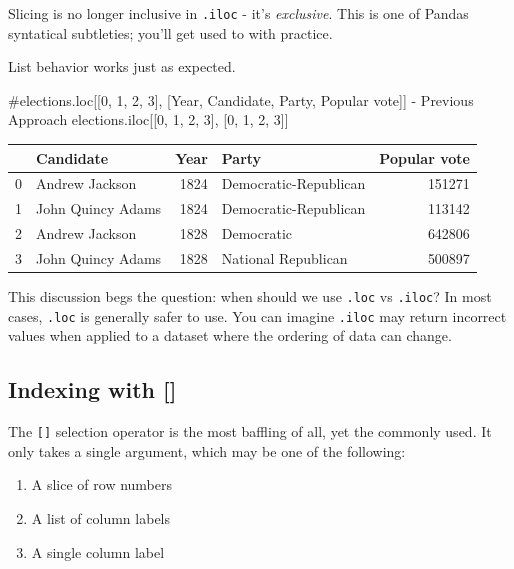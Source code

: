 \documentclass[
  letterpaper,
  DIV=11,
  numbers=noendperiod]{scrreprt}
\newenvironment{Shaded}{\begin{snugshade}}{\end{snugshade}}
\newcommand{\CommentTok}[1]{\textcolor[rgb]{0.37,0.37,0.37}{#1}}
\newcommand{\DecValTok}[1]{\textcolor[rgb]{0.68,0.00,0.00}{#1}}
\newcommand{\NormalTok}[1]{\textcolor[rgb]{0.00,0.23,0.31}{#1}}
\providecommand{\tightlist}{%
  \setlength{\itemsep}{0pt}\setlength{\parskip}{0pt}}\usepackage{longtable,booktabs,array}
\begin{document}
Slicing is no longer inclusive in \texttt{.iloc} - it's
\emph{exclusive}. This is one of Pandas syntatical subtleties; you'll
get used to with practice.

List behavior works just as expected.

\begin{Shaded}
\begin{Highlighting}[]
\CommentTok{\#elections.loc[[0, 1, 2, 3], [\textquotesingle{}Year\textquotesingle{}, \textquotesingle{}Candidate\textquotesingle{}, \textquotesingle{}Party\textquotesingle{}, \textquotesingle{}Popular vote\textquotesingle{}]] {-} Previous Approach}
\NormalTok{elections.iloc[[}\DecValTok{0}\NormalTok{, }\DecValTok{1}\NormalTok{, }\DecValTok{2}\NormalTok{, }\DecValTok{3}\NormalTok{], [}\DecValTok{0}\NormalTok{, }\DecValTok{1}\NormalTok{, }\DecValTok{2}\NormalTok{, }\DecValTok{3}\NormalTok{]]}
\end{Highlighting}
\end{Shaded}

\begin{tabular}{llrlr}
\toprule
{} &          Candidate &  Year &                  Party &  Popular vote \\
\midrule
0 &     Andrew Jackson &  1824 &  Democratic-Republican &        151271 \\
1 &  John Quincy Adams &  1824 &  Democratic-Republican &        113142 \\
2 &     Andrew Jackson &  1828 &             Democratic &        642806 \\
3 &  John Quincy Adams &  1828 &    National Republican &        500897 \\
\bottomrule
\end{tabular}

This discussion begs the question: when should we use \texttt{.loc} vs
\texttt{.iloc}? In most cases, \texttt{.loc} is generally safer to use.
You can imagine \texttt{.iloc} may return incorrect values when applied
to a dataset where the ordering of data can change.

\hypertarget{indexing-with}{%
\subsection{Indexing with {[}{]}}\label{indexing-with}}

The \texttt{{[}{]}} selection operator is the most baffling of all, yet
the commonly used. It only takes a single argument, which may be one of
the following:

\begin{enumerate}
\def\labelenumi{\arabic{enumi}.}
\tightlist
\item
  A slice of row numbers
\item
  A list of column labels
\item
  A single column label
\end{enumerate}
\end{document}
